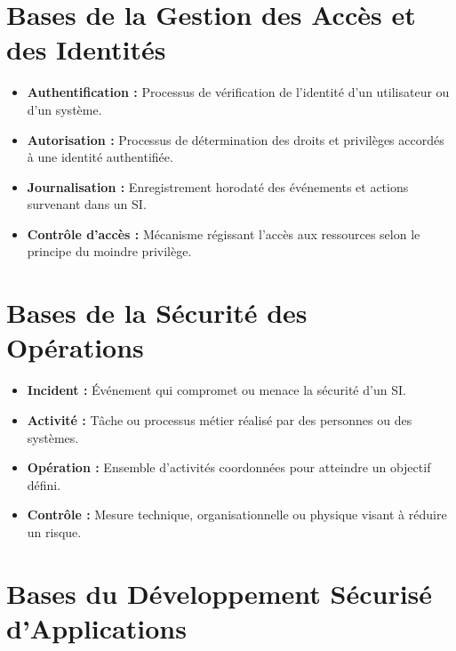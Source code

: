 \section{Bases de la Gestion des Accès et des Identités}

\begin{itemize}
    \item \textbf{Authentification :} Processus de vérification de l'identité d'un utilisateur ou d'un système.
    \item \textbf{Autorisation :} Processus de détermination des droits et privilèges accordés à une identité authentifiée.
    \item \textbf{Journalisation :} Enregistrement horodaté des événements et actions survenant dans un SI.
    \item \textbf{Contrôle d'accès :} Mécanisme régissant l'accès aux ressources selon le principe du moindre privilège.
\end{itemize}

\section{Bases de la Sécurité des Opérations}

\begin{itemize}
    \item \textbf{Incident :} Événement qui compromet ou menace la sécurité d'un SI.
    \item \textbf{Activité :} Tâche ou processus métier réalisé par des personnes ou des systèmes.
    \item \textbf{Opération :} Ensemble d'activités coordonnées pour atteindre un objectif défini.
    \item \textbf{Contrôle :} Mesure technique, organisationnelle ou physique visant à réduire un risque.
\end{itemize}

\section{Bases du Développement Sécurisé d'Applications}

